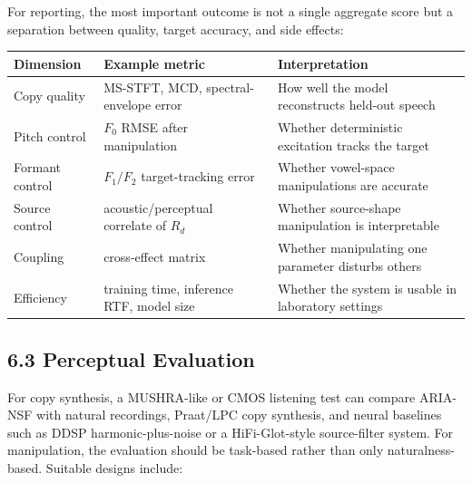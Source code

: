 For reporting, the most important outcome is not a single aggregate
score but a separation between quality, target accuracy, and side
effects:

{\def\LTcaptype{none} %
\begin{longtable}[]{@{}
  >{\raggedright\arraybackslash}p{}
  >{\raggedright\arraybackslash}p{}
  >{\raggedright\arraybackslash}p{}@{}}
\toprule\noalign{}
\begin{minipage}[b]{\linewidth}\raggedright
Dimension
\end{minipage} & \begin{minipage}[b]{\linewidth}\raggedright
Example metric
\end{minipage} & \begin{minipage}[b]{\linewidth}\raggedright
Interpretation
\end{minipage} \\
\midrule\noalign{}
\endhead
\bottomrule\noalign{}
\endlastfoot
Copy quality & MS-STFT, MCD, spectral-envelope error & How well the
model reconstructs held-out speech \\
Pitch control & \(F_0\) RMSE after manipulation & Whether deterministic
excitation tracks the target \\
Formant control & \(F_1/F_2\) target-tracking error & Whether
vowel-space manipulations are accurate \\
Source control & acoustic/perceptual correlate of \(R_d\) & Whether
source-shape manipulation is interpretable \\
Coupling & cross-effect matrix & Whether manipulating one parameter
disturbs others \\
Efficiency & training time, inference RTF, model size & Whether the
system is usable in laboratory settings \\
\end{longtable}
}

\subsection{6.3 Perceptual Evaluation}\label{perceptual-evaluation}

For copy synthesis, a MUSHRA-like or CMOS listening test can compare
ARIA-NSF with natural recordings, Praat/LPC copy synthesis, and neural
baselines such as DDSP harmonic-plus-noise or a HiFi-Glot-style
source-filter system. For manipulation, the evaluation should be
task-based rather than only naturalness-based. Suitable designs include:

